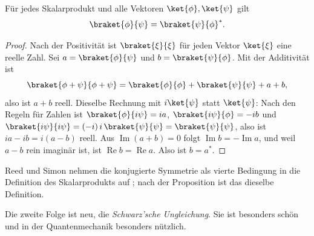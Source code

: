 \begin{proposition}\label{c03.prop.symmetrie}
  Für jedes Skalarprodukt und alle Vektoren $\ket{\phi}, \ket{\psi}$ gilt
  \begin{equation}\label{c03.eq.symmetrie}
    \braket{\phi}{\psi} = \braket{\psi}{\phi}^* .
  \end{equation}
\end{proposition}
\begin{proof}
  Nach der Positivität ist $\braket{\xi}{\xi}$ für jeden Vektor $\ket{\xi}$ eine reelle
  Zahl. Sei $a = \braket{\phi}{\psi}$ und $b = \braket{\psi}{\phi}$. Mit der Additivität ist
  \begin{equation}\label{c03.eq.symmetrie-beweis}
    \braket{\phi + \psi}{\phi + \psi} = \braket{\phi}{\phi} + \braket{\psi}{\psi} + a + b ,
  \end{equation}
  also ist $a + b$ reell. Dieselbe Rechnung mit $i\ket{\psi}$ statt $\ket{\psi}$: Nach den
  Regeln für Zahlen ist $\braket{\phi}{i\psi} = i a$, $\braket{i\psi}{\phi} = -i b$ und
  $\braket{i\psi}{i\psi} = (-i)\, i\, \braket{\psi}{\psi} = \braket{\psi}{\psi}$, also ist
  $i a - i b = i (a - b)$ reell. Aus $\operatorname{Im}(a + b) = 0$ folgt
  $\operatorname{Im} b = -\operatorname{Im} a$, und weil $a - b$ rein imaginär ist, ist
  $\operatorname{Re} b = \operatorname{Re} a$. Also ist $b = a^*$.
\end{proof}

Reed und Simon nehmen die konjugierte Symmetrie als vierte Bedingung in die Definition des
Skalarprodukts auf ; nach der Proposition ist das dieselbe
Definition.

Die zweite Folge ist neu, die \emph{Schwarz'sche Ungleichung}. Sie ist besonders schön und in
der Quantenmechanik besonders nützlich.

